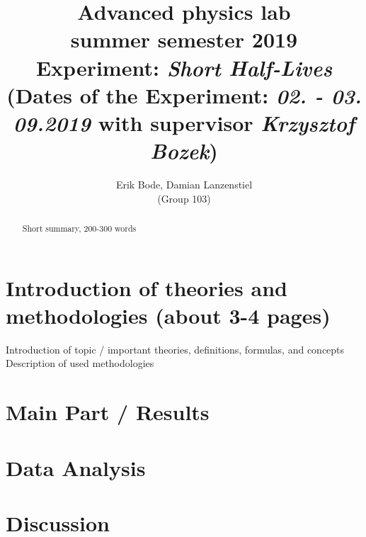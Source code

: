 \documentclass[titlepage,11pt,a4paper]{article}
\begin{document}
	\title{
		\large Advanced physics lab\\
		summer semester 2019 \\[4mm]
		\textbf{\LARGE 
			Experiment: \emph{Short Half-Lives}
		} \\[3mm]
		(Dates of the Experiment: \emph{02. - 03. 09.2019} with supervisor \emph{Krzysztof Bozek}) \\}
	\author{Erik Bode, Damian Lanzenstiel \\ (Group 103)}
	\maketitle
	\begin{abstract}
		Short summary, 200-300 words
	\end{abstract}

	\tableofcontents
	\listoffigures
	\listoftables

\section{Introduction of theories and methodologies (about 3-4 pages)}
Introduction of topic / important theories, definitions, formulas, and concepts
Description of used methodologies
\section{Main Part / Results}
\section{Data Analysis}
\section{Discussion}
\end{document}

